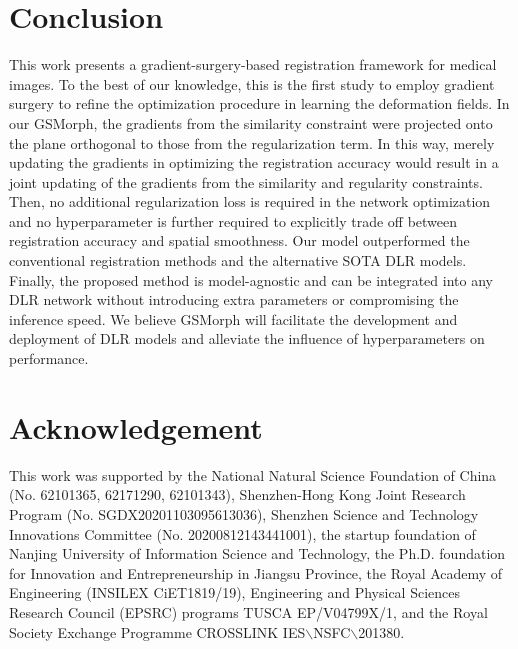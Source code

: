 \documentclass[runningheads]{llncs}
\begin{document}
\section{Conclusion}
This work presents a gradient-surgery-based registration framework for medical images. 
To the best of our knowledge, this is the first study to employ gradient surgery to refine the optimization procedure in learning the deformation fields. In our GSMorph, the gradients from the similarity constraint were projected onto the plane orthogonal to those from the regularization term. In this way, merely updating the gradients in optimizing the registration accuracy would result in a joint updating of the gradients from the similarity and regularity constraints. 
Then, no additional regularization loss is required in the network optimization and no hyperparameter is further required to explicitly trade off between registration accuracy and spatial smoothness. Our model outperformed the conventional registration methods and the alternative SOTA DLR models. Finally, the proposed method is model-agnostic and can be integrated into any DLR network without introducing extra parameters or compromising the inference speed. 
We believe GSMorph will facilitate the development and deployment of DLR models and alleviate the influence of hyperparameters on performance.

\section{Acknowledgement}
This work was supported by the National Natural Science Foundation of China (No. 62101365, 62171290, 62101343), Shenzhen-Hong Kong Joint Research Program (No. SGDX20201103095613036), Shenzhen Science and Technology Innovations Committee (No. 20200812143441001), the startup foundation of Nanjing University of Information Science and Technology, the Ph.D. foundation for Innovation and Entrepreneurship in Jiangsu Province, the Royal Academy of Engineering (INSILEX CiET1819/19), Engineering and Physical Sciences Research Council (EPSRC) programs TUSCA EP/V04799X/1, and the Royal Society Exchange Programme CROSSLINK  IES$\backslash$NSFC$\backslash$201380.
%
%
%


%
\end{document}
